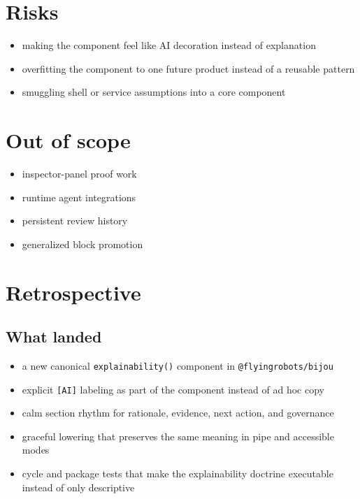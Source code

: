 \section{Risks}\label{record-172-risks}

\begin{itemize}
\tightlist
\item
  making the component feel like AI decoration instead of explanation
\item
  overfitting the component to one future product instead of a reusable pattern
\item
  smuggling shell or service assumptions into a core component
\end{itemize}

\section{Out of scope}\label{record-172-out-of-scope}

\begin{itemize}
\tightlist
\item
  inspector-panel proof work
\item
  runtime agent integrations
\item
  persistent review history
\item
  generalized block promotion
\end{itemize}

\section{Retrospective}\label{record-172-retrospective}

\subsection{What landed}\label{record-172-what-landed}

\begin{itemize}
\tightlist
\item
  a new canonical \texttt{e\allowbreak{}x\allowbreak{}p\allowbreak{}l\allowbreak{}a\allowbreak{}i\allowbreak{}n\allowbreak{}a\allowbreak{}b\allowbreak{}i\allowbreak{}l\allowbreak{}i\allowbreak{}t\allowbreak{}y\allowbreak{}(\allowbreak{})} component in \texttt{@\allowbreak{}f\allowbreak{}l\allowbreak{}y\allowbreak{}i\allowbreak{}n\allowbreak{}g\allowbreak{}r\allowbreak{}o\allowbreak{}b\allowbreak{}o\allowbreak{}t\allowbreak{}s\allowbreak{}/\allowbreak{}b\allowbreak{}i\allowbreak{}j\allowbreak{}o\allowbreak{}u}
\item
  explicit \texttt{[\allowbreak{}A\allowbreak{}I\allowbreak{}]} labeling as part of the component instead of ad hoc copy
\item
  calm section rhythm for rationale, evidence, next action, and governance
\item
  graceful lowering that preserves the same meaning in pipe and accessible modes
\item
  cycle and package tests that make the explainability doctrine executable instead of only descriptive
\end{itemize}

